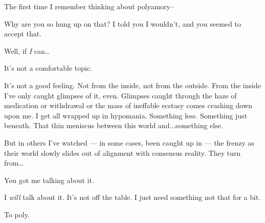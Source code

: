 The first time I remember thinking about polyamory--


Why are you so hung up on that? I told you I wouldn't, and you seemed to accept that.


Well, if \emph{I} can\ldots{}


It's not a comfortable topic.


It's not a good feeling. Not from the inside, not from the outside. From the inside I've only caught glimpses of it, even. Glimpses caught through the haze of medication or withdrawal or the mass of ineffable ecstasy comes crashing down upon me. I get all wrapped up in hypomania. Something less. Something just beneath. That thin meniscus between this world and...something else.

But in others I've watched --- in some cases, been caught up in --- the frenzy as their world slowly slides out of alignment with consensus reality. They turn from\ldots{}


You got me talking about it.


I \emph{will} talk about it. It's not off the table. I just need something not that for a bit.


To poly.
\newpage
